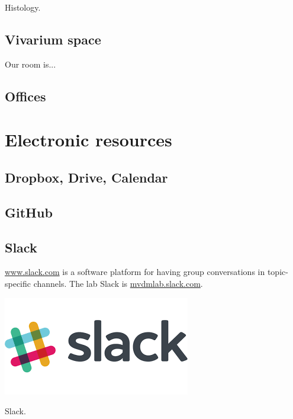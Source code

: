\documentclass{tufte-book}
\begin{document}
Histology.

\section{Vivarium space}

Our room is...

\section{Offices}


\chapter{Electronic resources}

\section{Dropbox, Drive, Calendar}

\section{GitHub}

\section{Slack}

\href{Slack}{www.slack.com} is a software platform for having group
conversations in topic-specific channels. The lab Slack is
\url{mvdmlab.slack.com}.

\begin{marginfigure}%
  \includegraphics[width=\linewidth]{images/slack.png}
  \caption{Slack.}
  \label{fig:slack}
\end{marginfigure}
\end{document}
